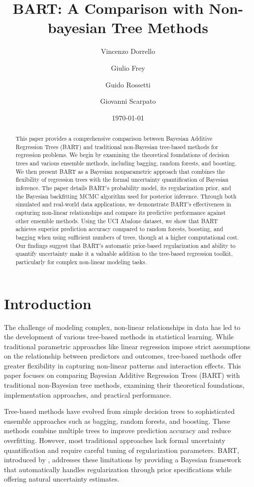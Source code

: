 \documentclass[a4paper,11pt]{article}
\title{BART: A Comparison with Non-bayesian Tree Methods}
\author{
    Vincenzo Dorrello 
    \and
    Giulio Frey 
    \and
    Guido Rossetti 
    \and
    Giovanni Scarpato 
}
\date{\today}
\begin{document}
\maketitle

\begin{abstract}
This paper provides a comprehensive comparison between Bayesian Additive Regression Trees (BART) and traditional non-Bayesian tree-based methods for regression problems. We begin by examining the theoretical foundations of decision trees and various ensemble methods, including bagging, random forests, and boosting. We then present BART as a Bayesian nonparametric approach that combines the flexibility of regression trees with the formal uncertainty quantification of Bayesian inference. The paper details BART's probability model, its regularization prior, and the Bayesian backfitting MCMC algorithm used for posterior inference. Through both simulated and real-world data applications, we demonstrate BART's effectiveness in capturing non-linear relationships and compare its predictive performance against other ensemble methods. Using the UCI Abalone dataset, we show that BART achieves superior prediction accuracy compared to random forests, boosting, and bagging when using sufficient numbers of trees, though at a higher computational cost. Our findings suggest that BART's automatic prior-based regularization and ability to quantify uncertainty make it a valuable addition to the tree-based regression toolkit, particularly for complex non-linear modeling tasks.
\end{abstract}

\newpage

\section{Introduction}


The challenge of modeling complex, non-linear relationships in data has led to the development of various tree-based methods in statistical learning. While traditional parametric approaches like linear regression impose strict assumptions on the relationship between predictors and outcomes, tree-based methods offer greater flexibility in capturing non-linear patterns and interaction effects. This paper focuses on comparing Bayesian Additive Regression Trees (BART) with traditional non-Bayesian tree methods, examining their theoretical foundations, implementation approaches, and practical performance.

Tree-based methods have evolved from simple decision trees to sophisticated ensemble approaches such as bagging, random forests, and boosting. These methods combine multiple trees to improve prediction accuracy and reduce overfitting. However, most traditional approaches lack formal uncertainty quantification and require careful tuning of regularization parameters. BART, introduced by \cite{chipmanBARTBayesianAdditive2010}, addresses these limitations by providing a Bayesian framework that automatically handles regularization through prior specifications while offering natural uncertainty estimates.
\end{document}
